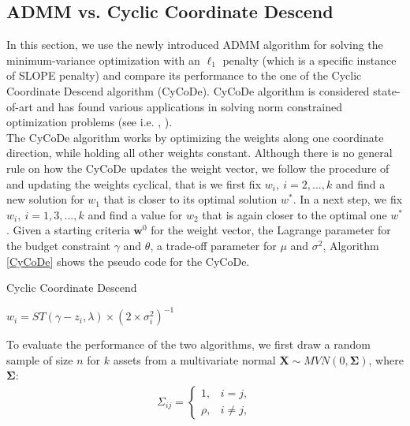 \documentclass[12pt, a4paper]{article}
\begin{document}
\subsection{ADMM vs. Cyclic Coordinate Descend} \label{AlgoComp}
In this section, we use the newly introduced ADMM algorithm for solving the minimum-variance optimization with an $\ell_{1}$ penalty (which is a specific instance of SLOPE penalty) and compare its performance to the one of the Cyclic Coordinate Descend algorithm (CyCoDe). CyCoDe algorithm is considered state-of-art and has found various applications in solving norm constrained optimization problems (see i.e. \cite{Fastrich2014}, \cite{Yen2015}).\\
The CyCoDe algorithm works by optimizing the weights along one coordinate direction, while holding all other weights constant. Although there is no general rule on how the CyCoDe updates the weight vector, we follow the procedure of \cite{Yen2015} and updating the weights cyclical, that is we first fix $w_i, \ i=2,...,k$ and find a new solution for $w_1$ that is closer to its optimal solution $w^{*}$. In a next step, we fix $w_i, \ i=1,3,...,k$ and find a value for $w_{2}$ that is again closer to the optimal one $w^{*}$. Given a starting criteria $\boldsymbol{w}^{0}$ for the weight vector, the Lagrange parameter for the budget constraint $\gamma$ and $\theta$, a trade-off parameter for $\mu$ and $\sigma^{2}$, Algorithm \ref{CyCoDe} shows the pseudo code for the CyCoDe.\\
\begin{algorithm}
\caption{Cyclic Coordinate Descend}\label{CyCoDe}
\begin{algorithmic}[1]
\STATE
{$w_{i} = ST(\gamma-z_{i}, \lambda) \times (2 \times \sigma_{i}^{2})^{-1}$}
\ENDFOR
{}
\ENDWHILE
\end{algorithmic}
\end{algorithm}
To evaluate the performance of the two algorithms, we first draw a random sample of size $n$ for $k$ assets from a multivariate normal $\boldsymbol{X} \sim MVN(0, \boldsymbol{\Sigma})$, where $\boldsymbol{\Sigma}$:
\begin{gather}
\Sigma_{ij} =
 \begin{cases}
1, & i=j, \\
\rho, & i \neq j,
  \end{cases}
\end{gather}
\end{document}
